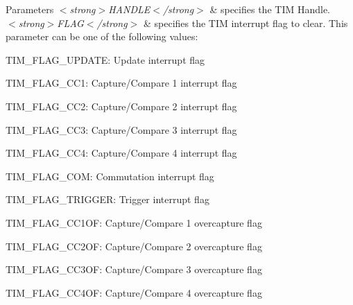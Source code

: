 \begin{DoxyParams}{Parameters}
{\em $<$strong$>$\-H\-A\-N\-D\-L\-E$<$/strong$>$} & specifies the T\-I\-M Handle. \\
\hline
{\em $<$strong$>$\-F\-L\-A\-G$<$/strong$>$} & specifies the T\-I\-M interrupt flag to clear. This parameter can be one of the following values\-: \begin{DoxyItemize}
\item T\-I\-M\-\_\-\-F\-L\-A\-G\-\_\-\-U\-P\-D\-A\-T\-E\-: Update interrupt flag \item T\-I\-M\-\_\-\-F\-L\-A\-G\-\_\-\-C\-C1\-: Capture/\-Compare 1 interrupt flag \item T\-I\-M\-\_\-\-F\-L\-A\-G\-\_\-\-C\-C2\-: Capture/\-Compare 2 interrupt flag \item T\-I\-M\-\_\-\-F\-L\-A\-G\-\_\-\-C\-C3\-: Capture/\-Compare 3 interrupt flag \item T\-I\-M\-\_\-\-F\-L\-A\-G\-\_\-\-C\-C4\-: Capture/\-Compare 4 interrupt flag \item T\-I\-M\-\_\-\-F\-L\-A\-G\-\_\-\-C\-O\-M\-: Commutation interrupt flag \item T\-I\-M\-\_\-\-F\-L\-A\-G\-\_\-\-T\-R\-I\-G\-G\-E\-R\-: Trigger interrupt flag \item T\-I\-M\-\_\-\-F\-L\-A\-G\-\_\-\-C\-C1\-O\-F\-: Capture/\-Compare 1 overcapture flag \item T\-I\-M\-\_\-\-F\-L\-A\-G\-\_\-\-C\-C2\-O\-F\-: Capture/\-Compare 2 overcapture flag \item T\-I\-M\-\_\-\-F\-L\-A\-G\-\_\-\-C\-C3\-O\-F\-: Capture/\-Compare 3 overcapture flag \item T\-I\-M\-\_\-\-F\-L\-A\-G\-\_\-\-C\-C4\-O\-F\-: Capture/\-Compare 4 overcapture flag \end{DoxyItemize}
\\
\hline
\end{DoxyParams}

